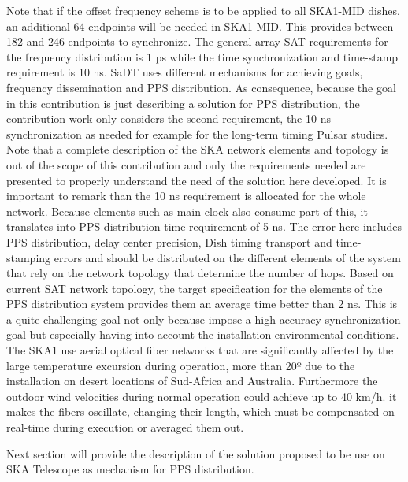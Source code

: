Note that if the offset frequency scheme is to be applied to all SKA1-MID dishes, an additional 64 endpoints will be needed in SKA1-MID. This provides between 182 and 246 endpoints to synchronize. 
The general array SAT requirements for the frequency distribution is 1 ps while the time synchronization and time-stamp requirement is 10 ns. SaDT uses different mechanisms for achieving goals, frequency dissemination and PPS distribution. As consequence, because the goal in this contribution is just describing a solution for PPS distribution, the contribution work only considers the second requirement, the 10 ns synchronization as needed for example for the long-term timing Pulsar studies. Note that a complete description of the SKA network elements and topology is out of the scope of this contribution and only the requirements needed are presented to properly understand the need of the solution here developed. 
It is important to remark than the 10 ns requirement is allocated for the whole 
network. Because elements such as main clock also consume part of this, it 
translates into PPS-distribution time requirement of 5 ns. The error here 
includes PPS distribution, delay center precision, Dish timing transport and 
time-stamping errors and should be distributed on the different elements of the 
system that rely on the network topology that determine the number of hops. 
Based on current SAT network topology, the target specification for the 
elements of the PPS distribution system provides them an average time better 
than 2 ns. This is a quite challenging goal not only because impose a high 
accuracy synchronization goal but especially having into account the 
installation environmental conditions. The SKA1 use aerial optical fiber 
networks that are significantly affected by the large temperature excursion 
during operation, more than 20º due to the installation on desert locations of 
Sud-Africa and Australia. Furthermore the outdoor wind velocities during normal 
operation could achieve up to 40 km/h. it makes the fibers oscillate, changing 
their length, which must be compensated on real-time during execution or 
averaged them out. 

Next section will provide the description of the solution proposed to be use on SKA Telescope as mechanism for PPS distribution. 



